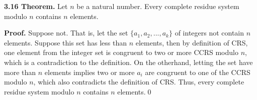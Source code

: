 \documentclass[12pt]{article}
\begin{document}
\noindent\textbf{3.16 Theorem.} Let $n$ be a natural number. Every complete residue system modulo $n$ contains $n$ elements.

\bigskip

\noindent\textbf{Proof.} Suppose not. That is, let the set $\{a_1,a_2,...,a_k\}$ of integers not contain $n$ elements. Suppose this set has less than $n$ elements, then by definition of CRS, one element from the integer set is congruent to two or more CCRS modulo $n$, which is a contradiction to the definition. On the otherhand, letting the set have more than $n$ elements implies two or more $a_i$ are congruent to one of the CCRS modulo $n$, which also contradicts the definition of CRS. Thus, every complete residue system modulo $n$ contains $n$ elements.\qed
\end{document}
